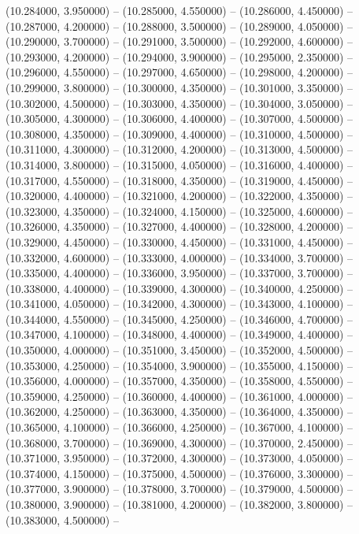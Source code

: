 (10.284000, 3.950000) -- 
(10.285000, 4.550000) -- 
(10.286000, 4.450000) -- 
(10.287000, 4.200000) -- 
(10.288000, 3.500000) -- 
(10.289000, 4.050000) -- 
(10.290000, 3.700000) -- 
(10.291000, 3.500000) -- 
(10.292000, 4.600000) -- 
(10.293000, 4.200000) -- 
(10.294000, 3.900000) -- 
(10.295000, 2.350000) -- 
(10.296000, 4.550000) -- 
(10.297000, 4.650000) -- 
(10.298000, 4.200000) -- 
(10.299000, 3.800000) -- 
(10.300000, 4.350000) -- 
(10.301000, 3.350000) -- 
(10.302000, 4.500000) -- 
(10.303000, 4.350000) -- 
(10.304000, 3.050000) -- 
(10.305000, 4.300000) -- 
(10.306000, 4.400000) -- 
(10.307000, 4.500000) -- 
(10.308000, 4.350000) -- 
(10.309000, 4.400000) -- 
(10.310000, 4.500000) -- 
(10.311000, 4.300000) -- 
(10.312000, 4.200000) -- 
(10.313000, 4.500000) -- 
(10.314000, 3.800000) -- 
(10.315000, 4.050000) -- 
(10.316000, 4.400000) -- 
(10.317000, 4.550000) -- 
(10.318000, 4.350000) -- 
(10.319000, 4.450000) -- 
(10.320000, 4.400000) -- 
(10.321000, 4.200000) -- 
(10.322000, 4.350000) -- 
(10.323000, 4.350000) -- 
(10.324000, 4.150000) -- 
(10.325000, 4.600000) -- 
(10.326000, 4.350000) -- 
(10.327000, 4.400000) -- 
(10.328000, 4.200000) -- 
(10.329000, 4.450000) -- 
(10.330000, 4.450000) -- 
(10.331000, 4.450000) -- 
(10.332000, 4.600000) -- 
(10.333000, 4.000000) -- 
(10.334000, 3.700000) -- 
(10.335000, 4.400000) -- 
(10.336000, 3.950000) -- 
(10.337000, 3.700000) -- 
(10.338000, 4.400000) -- 
(10.339000, 4.300000) -- 
(10.340000, 4.250000) -- 
(10.341000, 4.050000) -- 
(10.342000, 4.300000) -- 
(10.343000, 4.100000) -- 
(10.344000, 4.550000) -- 
(10.345000, 4.250000) -- 
(10.346000, 4.700000) -- 
(10.347000, 4.100000) -- 
(10.348000, 4.400000) -- 
(10.349000, 4.400000) -- 
(10.350000, 4.000000) -- 
(10.351000, 3.450000) -- 
(10.352000, 4.500000) -- 
(10.353000, 4.250000) -- 
(10.354000, 3.900000) -- 
(10.355000, 4.150000) -- 
(10.356000, 4.000000) -- 
(10.357000, 4.350000) -- 
(10.358000, 4.550000) -- 
(10.359000, 4.250000) -- 
(10.360000, 4.400000) -- 
(10.361000, 4.000000) -- 
(10.362000, 4.250000) -- 
(10.363000, 4.350000) -- 
(10.364000, 4.350000) -- 
(10.365000, 4.100000) -- 
(10.366000, 4.250000) -- 
(10.367000, 4.100000) -- 
(10.368000, 3.700000) -- 
(10.369000, 4.300000) -- 
(10.370000, 2.450000) -- 
(10.371000, 3.950000) -- 
(10.372000, 4.300000) -- 
(10.373000, 4.050000) -- 
(10.374000, 4.150000) -- 
(10.375000, 4.500000) -- 
(10.376000, 3.300000) -- 
(10.377000, 3.900000) -- 
(10.378000, 3.700000) -- 
(10.379000, 4.500000) -- 
(10.380000, 3.900000) -- 
(10.381000, 4.200000) -- 
(10.382000, 3.800000) -- 
(10.383000, 4.500000) -- 
